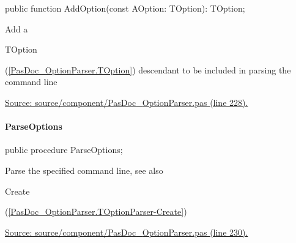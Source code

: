 \documentclass{report}
\newif\ifpdf
\begin{document}
\label{PasDoc_OptionParser.TOptionParser-AddOption}
\begin{list}{}{
\setlength{\itemindent}{0cm}
\setlength{\listparindent}{0cm}
\setlength{\leftmargin}{\evensidemargin}
\addtolength{\leftmargin}{\tmplength}
\settowidth{\labelsep}{X}
\addtolength{\leftmargin}{\labelsep}
\setlength{\labelwidth}{\tmplength}
}
\item[\textbf{Declaration}\hfill]
\ifpdf
\begin{flushleft}
\fi
\begin{ttfamily}
public function AddOption(const AOption: TOption): TOption;\end{ttfamily}

\ifpdf
\end{flushleft}
\fi

\par
\item[\textbf{Description}]
Add a \begin{ttfamily}TOption\end{ttfamily}(\ref{PasDoc_OptionParser.TOption}) descendant to be included in parsing the command line\par
\href{https://github.com/pasdoc/pasdoc/blob/master/source/component/PasDoc_OptionParser.pas#L228}{Source: source/component/PasDoc{\_}OptionParser.pas (line 228).}

\end{list}
\paragraph*{ParseOptions}\hspace*{\fill}

\label{PasDoc_OptionParser.TOptionParser-ParseOptions}
\begin{list}{}{
\setlength{\itemindent}{0cm}
\setlength{\listparindent}{0cm}
\setlength{\leftmargin}{\evensidemargin}
\addtolength{\leftmargin}{\tmplength}
\settowidth{\labelsep}{X}
\addtolength{\leftmargin}{\labelsep}
\setlength{\labelwidth}{\tmplength}
}
\item[\textbf{Declaration}\hfill]
\ifpdf
\begin{flushleft}
\fi
\begin{ttfamily}
public procedure ParseOptions;\end{ttfamily}

\ifpdf
\end{flushleft}
\fi

\par
\item[\textbf{Description}]
Parse the specified command line, see also \begin{ttfamily}Create\end{ttfamily}(\ref{PasDoc_OptionParser.TOptionParser-Create})\par
\href{https://github.com/pasdoc/pasdoc/blob/master/source/component/PasDoc_OptionParser.pas#L230}{Source: source/component/PasDoc{\_}OptionParser.pas (line 230).}

\end{list}
\end{document}
